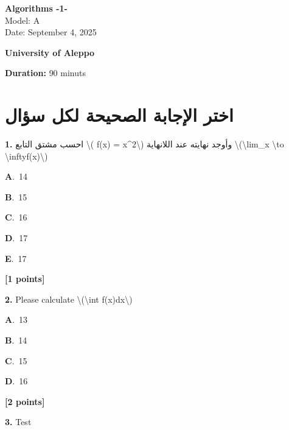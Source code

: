 \documentclass[12pt]{article}
\newcommand{\choice}[3]{%
  \noindent\textbf{#1}.~#2\hfill#3\par\vspace{0.25em}
}
\begin{document}
\begin{flushright}
{\Large \textbf{{\textenglish{Algorithms -1-}}}}\\[0.25em]
{\normalsize \textenglish{Model: }{\textenglish{A}}}\\[0.1em]
{\normalsize \textenglish{Date: }{\textenglish{September 4, 2025}}}
\end{flushright}

\vspace{0.6cm}

\noindent
\begin{minipage}[t]{0.65\textwidth}
  \raggedright
  \textbf{{\textenglish{University of Aleppo}}}\\[0.3em]
\end{minipage}\hfill
\begin{minipage}[t]{0.3\textwidth}
  \raggedleft
  \textenglish{\textbf{Duration: }}{\textenglish{90 minuts}}
\end{minipage}

\vspace{0.9cm}

\section*{اختر الإجابة الصحيحة لكل سؤال}

\noindent \textbf{\textenglish{1.}} {\textarabic{احسب مشتق التابع \textbackslash{}( f(x) = x\^{}2\textbackslash{}) وأوجد نهايته عند اللانهاية \textbackslash{}(\textbackslash{}lim\_{x \textbackslash{}to \textbackslash{}infty}f(x)\textbackslash{})}}

\noindent\choice{A}{{\textenglish{14}}}{}
\noindent\choice{B}{{\textenglish{15}}}{}
\noindent\choice{C}{{\textenglish{16}}}{}
\noindent\choice{D}{{\textenglish{17}}}{}
\noindent\choice{E}{{\textenglish{17}}}{}
\hfill \textbf{[1 points]}\vspace{0.5em}

\noindent \textbf{\textenglish{2.}} {\textenglish{Please calculate \textbackslash{}(\textbackslash{}int f(x)dx\textbackslash{})}}

\noindent\choice{A}{{\textenglish{13}}}{}
\noindent\choice{B}{{\textenglish{14}}}{}
\noindent\choice{C}{{\textenglish{15}}}{}
\noindent\choice{D}{{\textenglish{16}}}{}
\hfill \textbf{[2 points]}\vspace{0.5em}

\noindent \textbf{\textenglish{3.}} {\textenglish{Test}}
\end{document}
